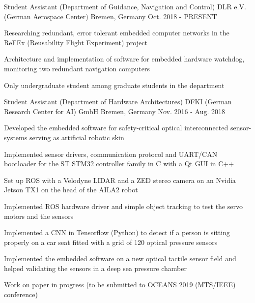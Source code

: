 

\begin{cventries}

  \cventry
    {Student Assistant (Department of Guidance, Navigation and Control)} %
    {DLR e.V. (German Aerospace Center)} %
    {Bremen, Germany} %
    {Oct. 2018 - PRESENT} %
    {
      \begin{cvitems} %
        \item {Researching redundant, error tolerant embedded computer networks in the ReFEx (Reusability Flight Experiment) project}
        \item {Architecture and implementation of software for embedded hardware watchdog, monitoring two redundant navigation computers}
        \item {Only undergraduate student among graduate students in the department}
      \end{cvitems}
    }
    
  \cventry
    {Student Assistant (Department of Hardware Architectures)} %
    {DFKI (German Research Center for AI) GmbH} %
    {Bremen, Germany} %
    {Nov. 2016 - Aug. 2018} %
    {
      \begin{cvitems} %
        \item {Developed the embedded software for safety-critical optical interconnected sensor-systems serving as artificial robotic skin}
        \item {Implemented sensor drivers, communication protocol and UART/CAN bootloader for the ST STM32 controller family in C with a Qt GUI in C++}
        \item {Set up ROS with a Velodyne LIDAR and a ZED stereo camera on an Nvidia Jetson TX1 on the head of the AILA2 robot}
        \item {Implemented ROS hardware driver and simple object tracking to test the servo motors and the sensors}
        \item {Implemented a CNN in Tensorflow (Python) to detect if a person is sitting properly on a car seat fitted with a grid of 120 optical pressure sensors}
        \item {Implemented the embedded software on a new optical tactile sensor field and helped validating the sensors in a deep sea pressure chamber}
        \item {Work on paper in progress (to be submitted to OCEANS 2019 (MTS/IEEE) conference)}
      \end{cvitems}
    }


\end{cventries}
